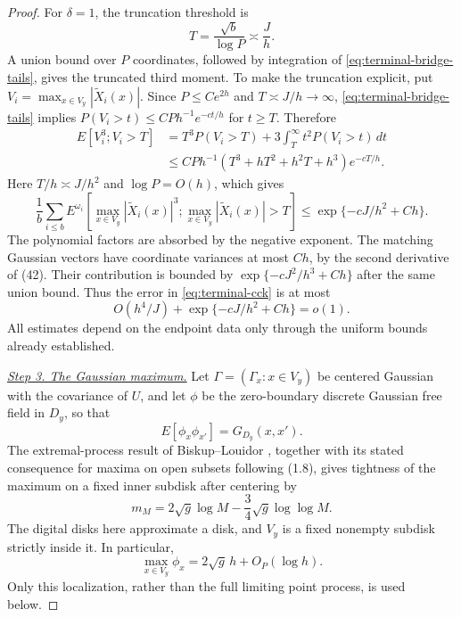 \begin{proof}
For $\delta=1$, the truncation threshold is
\[
 T=\frac{\sqrt b}{\log P}\asymp\frac Jh.
\]
A union bound over $P$ coordinates, followed by integration of
\eqref{eq:terminal-bridge-tails}, gives the truncated third moment. To
make the truncation explicit, put
$V_i=\max_{x\in V_y}|\widetilde X_i(x)|$. Since $P\le Ce^{2h}$ and
$T\asymp J/h\to\infty$, \eqref{eq:terminal-bridge-tails} implies
$P(V_i>t)\le CP h^{-1}e^{-ct/h}$ for $t\ge T$. Therefore
\[
\begin{aligned}
 E[V_i^3;V_i>T]
 &=T^3P(V_i>T)+3\int_T^\infty t^2P(V_i>t)\,dt\\
 &\le CP h^{-1}(T^3+hT^2+h^2T+h^3)e^{-cT/h}.
\end{aligned}
\]
Here $T/h\asymp J/h^2$ and $\log P=O(h)$, which gives
\begin{equation}
 \frac1b\sum_{i\le b}E^{\omega_i}\left[
   \max_{x\in V_y}|\widetilde X_i(x)|^3;
   \max_{x\in V_y}|\widetilde X_i(x)|>T\right]
 \le \exp\{-cJ/h^2+Ch\}.
 \tag{72}\label{eq:terminal-truncated-third-moment}
\end{equation}
The polynomial factors are absorbed by the negative exponent. The
matching Gaussian vectors have coordinate variances
at most $Ch$, by the second derivative of (42).  Their contribution
is bounded by $\exp\{-cJ^2/h^3+Ch\}$ after the same union bound.
Thus the error in \eqref{eq:terminal-cck} is at most
\begin{equation}
 O(h^4/J)+\exp\{-cJ/h^2+Ch\}=o(1).
 \tag{73}\label{eq:terminal-cck-error}
\end{equation}
All estimates depend on the endpoint data only through the uniform
bounds already established.

\smallskip\noindent
\underline{\textit{Step 3. The Gaussian maximum.}}
Let $\Gamma=(\Gamma_x:x\in V_y)$ be centered Gaussian with the
covariance of $U$, and let $\phi$ be the zero-boundary discrete
Gaussian free field in $D_y$, so that
\[
 E[\phi_x\phi_{x'}]=G_{D_y}(x,x').
\]
The extremal-process result of Biskup--Louidor
\cite[(1.2), (1.6), and Theorem~2.1]{BiskupLouidor2018}, together
with its stated consequence for maxima on open subsets following
(1.8), gives tightness of the maximum on a fixed inner subdisk after
centering by
\[
 m_M=2\sqrt g\log M-\frac34\sqrt g\log\log M.
\]
The digital disks here approximate a disk, and $V_y$ is a fixed
nonempty subdisk strictly inside it.  In particular,
\begin{equation}
 \max_{x\in V_y}\phi_x=2\sqrt g\,h+O_P(\log h).
 \tag{75}\label{eq:terminal-dgff-maximum}
\end{equation}
Only this localization, rather than the full limiting point process,
is used below.


\end{proof}
